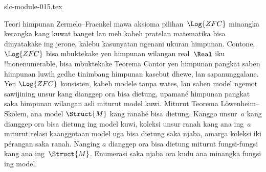 \begin{filecontents*}[overwrite]{slc-module-015.tex}
\begin{ex}
Teori himpunan Zermelo--Fraenkel mawa aksioma pilihan~$\Log{ZFC}$ minangka kerangka kang
kuwat banget lan meh kabeh pratelan matematika bisa dinyatakake ing
jerone, kalebu kasunyatan ngenani ukuran himpunan. Contone,
$\Log{ZFC}$ bisa mbuktekake yen himpunan wilangan real~$\Real$ iku
!!{nonenumerable}, bisa mbuktekake Teorema Cantor yen himpunan pangkat
saben himpunan luwih gedhe tinimbang himpunan kasebut dhewe, lan
sapanunggalane. Yen $\Log{ZFC}$ konsisten, kabeh modele tanpa wates,
lan saben model ngemot sawijining unsur kang dianggep ora
bisa dietung, upamané himpunan pangkat saka himpunan wilangan asli
miturut model kuwi. Miturut Teorema L\"owenheim--Skolem, ana model
$\Struct{M}$ kang ranahé bisa dietung. Kanggo unsur~$a$ kang
dianggep ora bisa dietung ing model kuwi, koleksi unsur ranah
kang ana ing~$a$ miturut relasi kaanggotaan model uga bisa dietung
saka njaba, amarga koleksi iki pérangan saka ranah. Nanging
$a$ dianggep ora bisa dietung miturut fungsi-fungsi kang ana ing~$\Struct{M}$. Enumerasi saka njaba ora kudu ana minangka fungsi ing model.
\end{ex}


\end{filecontents*}

